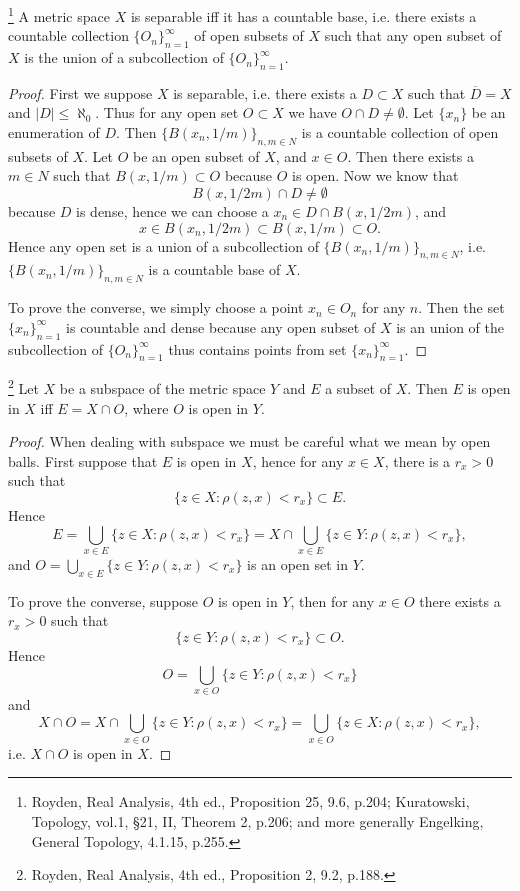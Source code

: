 \begin{proposition} \label{P:metric_base}
\footnote{Royden, Real Analysis, 4th ed., Proposition 25, 9.6, p.204; 
    Kuratowski, Topology, vol.1, \S 21, II, Theorem 2, p.206;
    and more generally Engelking, General Topology, 4.1.15, p.255.}
A metric space $X$ is separable iff it has a countable base, i.e. there exists a
countable collection $\{O_n\}_{n=1}^{\infty}$ of open subsets of $X$ such that
any open subset of $X$ is the union of a subcollection of 
$\{O_n\}_{n=1}^{\infty}$. 
\end{proposition}
\begin{proof}
First we suppose $X$ is separable, i.e. there exists a $D\subset X$ such that 
$\overline{D}=X$ and $|D|\leq\aleph_0$. Thus for any open set $O\subset X$ we have 
$O\cap D\neq\emptyset$. Let $\{x_n\}$ be an enumeration of $D$. Then 
$\{B(x_n,1/m)\}_{n,m\in N}$
is a countable collection of open subsets of $X$. Let $O$ be an open subset of
$X$, and $x\in O$. Then there exists a $m\in N$ such that $B(x,1/m)\subset O$
because $O$ is open. Now we know that 
\[
  B(x,1/2m)\cap D\neq \emptyset
\]
because $D$ is dense, hence we can choose a $x_n\in D\cap B(x,1/2m)$, and
\[
  x\in B(x_n,1/2m) \subset B(x,1/m) \subset O.
\]
Hence any open set is a union of a subcollection of $\{B(x_n,1/m)\}_{n,m\in N}$,
i.e. $\{B(x_n,1/m)\}_{n,m\in N}$ is a countable base of $X$.

To prove the converse, we simply choose a point $x_n\in O_n$ for any $n$. Then
the set $\{x_n\}_{n=1}^{\infty}$ is countable and dense because any open subset
of $X$ is an union of the subcollection of $\{O_n\}_{n=1}^{\infty}$ thus
contains points from set $\{x_n\}_{n=1}^{\infty}$.
\end{proof}

\begin{lemma}
\footnote{Royden, Real Analysis, 4th ed., Proposition 2, 9.2, p.188.} 
Let $X$ be a subspace of the metric space $Y$ and $E$ a subset of $X$. Then $E$
is open in $X$ iff $E=X\cap O$, where $O$ is open in $Y$.
\end{lemma}
\begin{proof}
When dealing with subspace we must be careful what we mean by open balls.
First suppose that $E$ is open in $X$, hence for any $x\in X$, there is a 
$r_x>0$ such that
\[
  \{z\in X:\rho(z,x)<r_x\} \subset E.
\]
Hence
\[
  E= \bigcup_{x\in E} \{ z\in X : \rho(z,x) < r_x \} 
   = X \cap \bigcup_{x\in E} \{ z\in Y : \rho(z,x) < r_x \},
\]
and $O= \bigcup_{x\in E} \{ z\in Y : \rho(z,x) < r_x \}$ is an open set in $Y$.

To prove the converse, suppose $O$ is open in $Y$, then for any $x\in O$ there
exists a $r_x>0$ such that
\[
  \{z\in Y:\rho(z,x)<r_x\} \subset O.
\]
Hence
\[
  O= \bigcup_{x\in O} \{ z\in Y : \rho(z,x) < r_x \} 
\]
and
\[
  X\cap O= X\cap \bigcup_{x\in O} \{ z\in Y : \rho(z,x) < r_x \} 
    = \bigcup_{x\in O} \{ z\in X : \rho(z,x) < r_x \},
\]
i.e. $X\cap O$ is open in $X$.
\end{proof}

